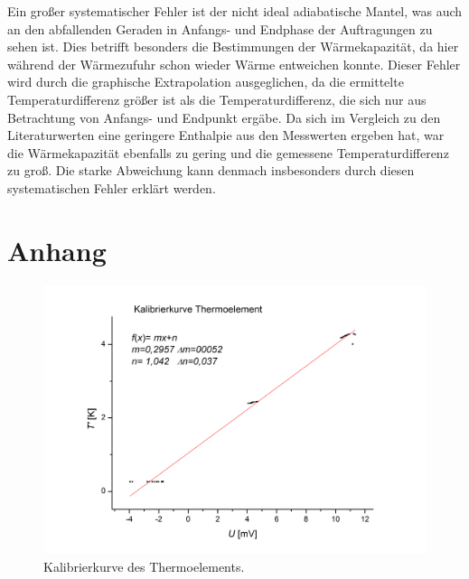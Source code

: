 \documentclass[12pt,a4paper,titlepage,headinclude,bibtotoc]{scrartcl}
\begin{document}
Ein großer systematischer Fehler ist der nicht ideal adiabatische Mantel, was auch an den abfallenden Geraden in Anfangs- und Endphase der Auftragungen zu sehen ist. Dies betrifft besonders die Bestimmungen der Wärmekapazität, da hier während der Wärmezufuhr schon wieder Wärme entweichen konnte. Dieser Fehler wird durch die graphische Extrapolation ausgeglichen, da die ermittelte Temperaturdifferenz größer ist als die Temperaturdifferenz, die sich nur aus Betrachtung von Anfangs- und Endpunkt ergäbe. 
Da sich im Vergleich zu den Literaturwerten eine geringere Enthalpie aus den Messwerten ergeben hat, war die Wärmekapazität ebenfalls zu gering und die gemessene Temperaturdifferenz zu groß. Die starke Abweichung kann denmach insbesonders durch diesen systematischen Fehler erklärt werden.\\


\newpage
\section{Anhang}

\begin{figure}[h] \label{Kalibrierkurve Thermoelement}
\centering
\includegraphics[width=13.5cm]{KalibrierkurveThermoelementOrigin.png}
\caption{Kalibrierkurve des Thermoelements.}
\end{figure} 
\FloatBarrier
\end{document}
